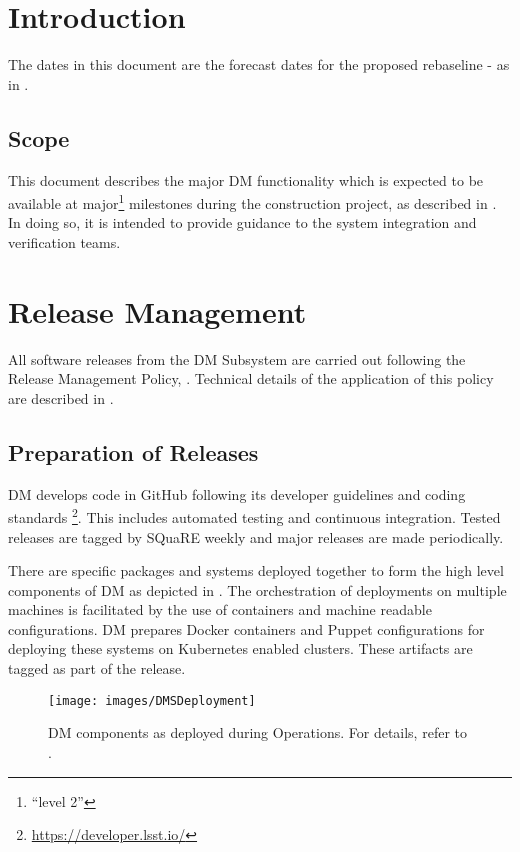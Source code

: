 \section{Introduction}
The dates in this document are the forecast dates for the proposed rebaseline - as in .
\subsection{Scope}

This document describes the major DM functionality which is expected to be available at major\footnote{ ``level 2''} milestones during the construction project, as described in .
In doing so, it is intended to provide guidance to the system integration and verification teams.

\section{Release Management}\label{sect:relman}

All software releases from the DM Subsystem are carried out following the Release Management Policy, .
Technical details of the application of this policy are described in .

\subsection{Preparation of Releases}\label{sect:relprep}

DM develops code in GitHub following its developer guidelines and coding standards \footnote{\url{https://developer.lsst.io/}}.
This includes automated testing and continuous integration.
Tested releases are tagged by SQuaRE weekly and major releases are made periodically.

There are specific packages and systems deployed together to form the high level components of DM as depicted in .
The orchestration of deployments on multiple machines is facilitated by the use of containers and machine readable configurations.
DM prepares Docker containers and Puppet configurations for deploying these systems on Kubernetes enabled clusters.
These artifacts are tagged as part of the release.

\begin{figure}[htbp]
        \begin{center}
                \texttt{[image: images/DMSDeployment]}
                \caption{DM components as deployed during Operations.
                         For details, refer to .
                \label{fig:dmsdeploy}}
        \end{center}
\end{figure}

